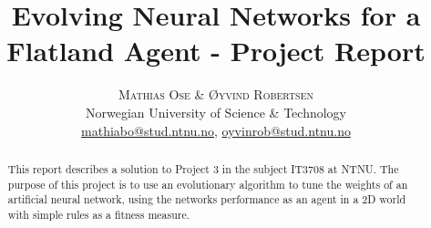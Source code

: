 \documentclass[twoside]{article}
\title{\vspace{-15mm}\fontsize{18pt}{10pt}\selectfont\textbf{Evolving Neural Networks for a Flatland Agent - Project Report}} %
\author{
    \large
    \textsc{Mathias Ose \& Øyvind Robertsen} \\ %
    \normalsize Norwegian University of Science \& Technology \\ %
    \normalsize \href{mailto:mathiabo@stud.ntnu.no}{mathiabo@stud.ntnu.no}, \href{mailto:oyvinrob@stud.ntnu.no}{oyvinrob@stud.ntnu.no} %
    \vspace{-5mm}
}
\date{}
\begin{document}
\maketitle %

\thispagestyle{fancy} %


\begin{abstract}

\noindent This report describes a solution to Project 3 in the subject IT3708 at NTNU. 
The purpose of this project is to use an evolutionary algorithm to tune the weights of an artificial neural network, using the networks performance as an agent in a 2D world with simple rules as a fitness measure.
\end{abstract}

\end{document}
